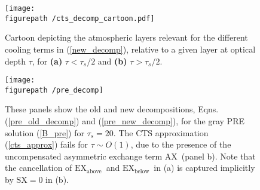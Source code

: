\documentclass{ametsoc}
\newcommand{\eqnref}[1]{(\ref{#1})}
\newcommand{\taus}{\ensuremath{\tau_s}}
\newcommand{\SX}{\ensuremath{\mathrm{SX}}}
\newcommand{\AX}{\ensuremath{\mathrm{AX}}}
\newcommand{\EXbelow}{\ensuremath{\mathrm{EX_{below}}}}
\newcommand{\EXabove}{\ensuremath{\mathrm{EX_{above}}}}
\newcommand{\figurepath}{../plots/}
\begin{document}

%
%
%
 
 



\begin{figure}[h!]
	\begin{center}
			\texttt{[image: \\figurepath /cts\_decomp\_cartoon.pdf]}
		\caption{Cartoon depicting the atmospheric layers relevant for the different cooling terms in \eqnref{new_decomp}, relative to a given layer at optical depth $\tau$, for \textbf{(a)} $\tau < \taus/2$  and \textbf{(b)} $\tau>\taus/2$.
		\label{decomp_cartoon}
		}
	\end{center}
\end{figure}

\begin{figure}[h]
	\begin{center}
			\texttt{[image: \\figurepath /pre\_decomp]}
		\caption{These panels show the old and new decompositions, Eqns. \eqnref{pre_old_decomp}  and  \eqnref{pre_new_decomp}, for the gray PRE solution \eqnref{B_pre} for $\taus=20$. The CTS approximation \eqnref{cts_approx} fails for $\tau\sim O(1)$, due to the presence of the uncompensated asymmetric exchange term \AX\ (panel b). Note that the cancellation of \EXabove\ and \EXbelow\ in (a) is captured implicitly by $\SX=0$ in (b).
		\label{pre_decomp}
		}
	\end{center}
\end{figure}
\end{document}
